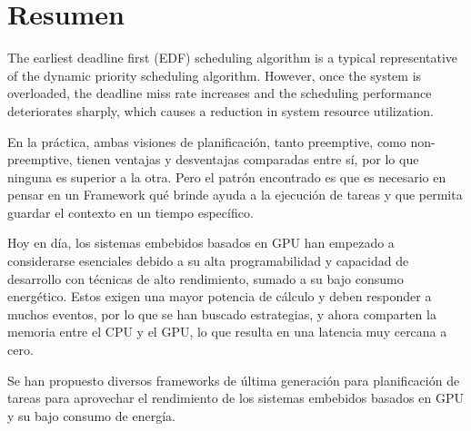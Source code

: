 \section{Resumen}

The earliest deadline first (EDF) scheduling algorithm is a typical representative of the dynamic priority scheduling algorithm. However, once the system is overloaded, the deadline miss rate increases and the scheduling performance deteriorates sharply, which causes a reduction in system resource utilization.

En la práctica, ambas visiones de planificación, tanto preemptive, como non-preemptive, tienen ventajas y desventajas comparadas entre sí, por lo que ninguna es superior a la otra. Pero el patrón encontrado es que es necesario en pensar en un Framework qué brinde ayuda a la ejecución de tareas y que permita guardar el contexto en un tiempo específico. 

Hoy en día, los sistemas embebidos basados en GPU han empezado a considerarse esenciales debido a su alta programabilidad y capacidad de desarrollo con técnicas de alto rendimiento, sumado a su bajo consumo energético. Estos exigen una mayor potencia de cálculo y deben responder a muchos eventos, por lo que se han buscado estrategias, y ahora comparten la memoria entre el CPU y el GPU, lo que resulta en una latencia muy cercana a cero.

Se han propuesto diversos frameworks de última generación para planificación de tareas para aprovechar el rendimiento de los sistemas embebidos basados en GPU y su bajo consumo de energía.





